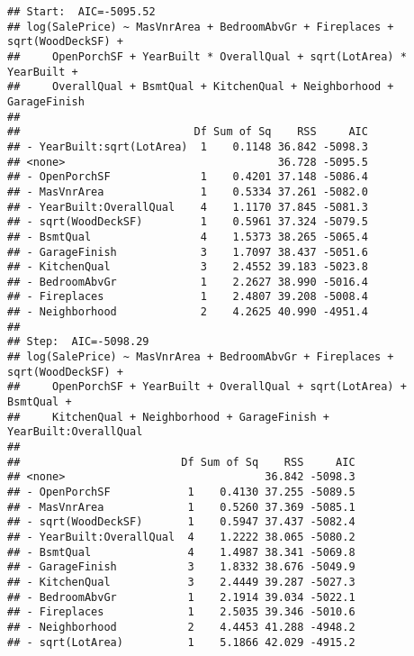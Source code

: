 \documentclass[
]{article}
\begin{document}
\begin{verbatim}
## Start:  AIC=-5095.52
## log(SalePrice) ~ MasVnrArea + BedroomAbvGr + Fireplaces + sqrt(WoodDeckSF) + 
##     OpenPorchSF + YearBuilt * OverallQual + sqrt(LotArea) * YearBuilt + 
##     OverallQual + BsmtQual + KitchenQual + Neighborhood + GarageFinish
## 
##                           Df Sum of Sq    RSS     AIC
## - YearBuilt:sqrt(LotArea)  1    0.1148 36.842 -5098.3
## <none>                                 36.728 -5095.5
## - OpenPorchSF              1    0.4201 37.148 -5086.4
## - MasVnrArea               1    0.5334 37.261 -5082.0
## - YearBuilt:OverallQual    4    1.1170 37.845 -5081.3
## - sqrt(WoodDeckSF)         1    0.5961 37.324 -5079.5
## - BsmtQual                 4    1.5373 38.265 -5065.4
## - GarageFinish             3    1.7097 38.437 -5051.6
## - KitchenQual              3    2.4552 39.183 -5023.8
## - BedroomAbvGr             1    2.2627 38.990 -5016.4
## - Fireplaces               1    2.4807 39.208 -5008.4
## - Neighborhood             2    4.2625 40.990 -4951.4
## 
## Step:  AIC=-5098.29
## log(SalePrice) ~ MasVnrArea + BedroomAbvGr + Fireplaces + sqrt(WoodDeckSF) + 
##     OpenPorchSF + YearBuilt + OverallQual + sqrt(LotArea) + BsmtQual + 
##     KitchenQual + Neighborhood + GarageFinish + YearBuilt:OverallQual
## 
##                         Df Sum of Sq    RSS     AIC
## <none>                               36.842 -5098.3
## - OpenPorchSF            1    0.4130 37.255 -5089.5
## - MasVnrArea             1    0.5260 37.369 -5085.1
## - sqrt(WoodDeckSF)       1    0.5947 37.437 -5082.4
## - YearBuilt:OverallQual  4    1.2222 38.065 -5080.2
## - BsmtQual               4    1.4987 38.341 -5069.8
## - GarageFinish           3    1.8332 38.676 -5049.9
## - KitchenQual            3    2.4449 39.287 -5027.3
## - BedroomAbvGr           1    2.1914 39.034 -5022.1
## - Fireplaces             1    2.5035 39.346 -5010.6
## - Neighborhood           2    4.4453 41.288 -4948.2
## - sqrt(LotArea)          1    5.1866 42.029 -4915.2
\end{verbatim}
\end{document}
